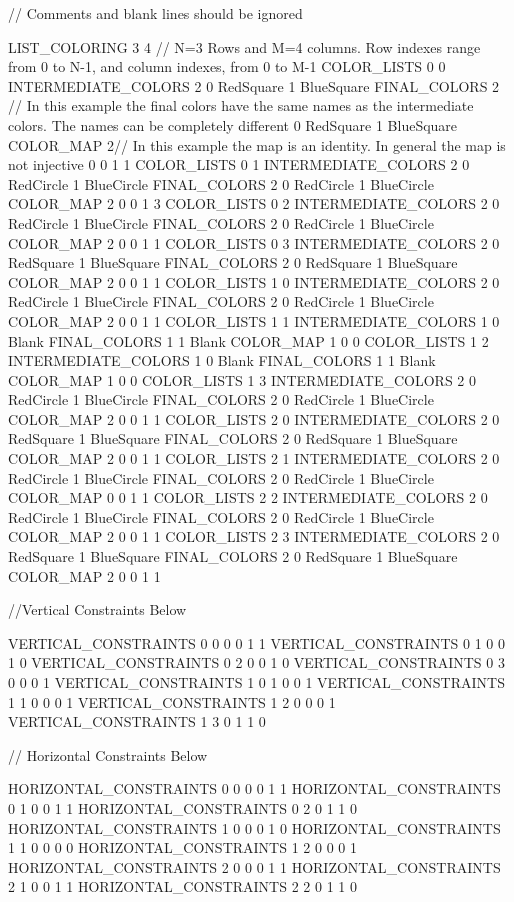 // Comments and blank lines should be ignored


LIST_COLORING  3 4 // N=3 Rows and M=4 columns. Row indexes range from 0 to N-1, and column indexes, from 0 to M-1
COLOR_LISTS 0 0 
INTERMEDIATE_COLORS 2
0 RedSquare
1 BlueSquare 
FINAL_COLORS 2 // In this example the final colors have the same names as the intermediate colors. The names can be completely different
0 RedSquare
1 BlueSquare 
COLOR_MAP 2// In this example the map is an identity. In general the map is not injective
0 0
1 1 
COLOR_LISTS 0 1 
INTERMEDIATE_COLORS 2
0 RedCircle
1 BlueCircle
FINAL_COLORS 2
0 RedCircle
1 BlueCircle
COLOR_MAP 2
0 0
1 3
COLOR_LISTS 0 2 
INTERMEDIATE_COLORS 2
0 RedCircle
1 BlueCircle
FINAL_COLORS 2
0 RedCircle
1 BlueCircle
COLOR_MAP 2
0 0
1 1
COLOR_LISTS 0 3 
INTERMEDIATE_COLORS 2
0 RedSquare
1 BlueSquare 
FINAL_COLORS 2 
0 RedSquare
1 BlueSquare 
COLOR_MAP 2 
0 0
1 1 
COLOR_LISTS 1 0
INTERMEDIATE_COLORS 2
0 RedCircle
1 BlueCircle
FINAL_COLORS 2
0 RedCircle
1 BlueCircle
COLOR_MAP 2
0 0
1 1
COLOR_LISTS 1 1 
INTERMEDIATE_COLORS 1
0 Blank 
FINAL_COLORS 1
1 Blank
COLOR_MAP 1
0 0
COLOR_LISTS 1 2 
INTERMEDIATE_COLORS 1
0 Blank 
FINAL_COLORS 1
1 Blank
COLOR_MAP 1
0 0
COLOR_LISTS 1 3
INTERMEDIATE_COLORS 2
0 RedCircle
1 BlueCircle
FINAL_COLORS 2
0 RedCircle
1 BlueCircle
COLOR_MAP 2
0 0
1 1
COLOR_LISTS 2 0 
INTERMEDIATE_COLORS 2
0 RedSquare
1 BlueSquare 
FINAL_COLORS 2 
0 RedSquare
1 BlueSquare 
COLOR_MAP 2
0 0
1 1 
COLOR_LISTS 2 1 
INTERMEDIATE_COLORS 2
0 RedCircle
1 BlueCircle
FINAL_COLORS 2
0 RedCircle
1 BlueCircle
COLOR_MAP 
0 0
1 1
COLOR_LISTS 2 2 
INTERMEDIATE_COLORS 2
0 RedCircle
1 BlueCircle
FINAL_COLORS 2
0 RedCircle
1 BlueCircle
COLOR_MAP 2
0 0
1 1
COLOR_LISTS 2 3 
INTERMEDIATE_COLORS 2
0 RedSquare
1 BlueSquare 
FINAL_COLORS 2 
0 RedSquare
1 BlueSquare 
COLOR_MAP 2 
0 0
1 1 

//Vertical Constraints Below


VERTICAL_CONSTRAINTS 0 0
0 0
1 1
VERTICAL_CONSTRAINTS 0 1
0 0
1 0
VERTICAL_CONSTRAINTS 0 2
0 0
1 0
VERTICAL_CONSTRAINTS 0 3
0 0
0 1
VERTICAL_CONSTRAINTS 1 0
1 0
0 1
VERTICAL_CONSTRAINTS 1 1
0 0
0 1
VERTICAL_CONSTRAINTS 1 2
0 0
0 1
VERTICAL_CONSTRAINTS 1 3
0 1
1 0


// Horizontal Constraints Below


HORIZONTAL_CONSTRAINTS 0 0
0 0
1 1
HORIZONTAL_CONSTRAINTS 0 1
0 0
1 1
HORIZONTAL_CONSTRAINTS 0 2
0 1
1 0
HORIZONTAL_CONSTRAINTS 1 0
0 0
1 0
HORIZONTAL_CONSTRAINTS 1 1 
0 0
0 0
HORIZONTAL_CONSTRAINTS 1 2
0 0
0 1
HORIZONTAL_CONSTRAINTS 2 0
0 0
1 1
HORIZONTAL_CONSTRAINTS 2 1
0 0
1 1
HORIZONTAL_CONSTRAINTS 2 2
0 1
1 0
